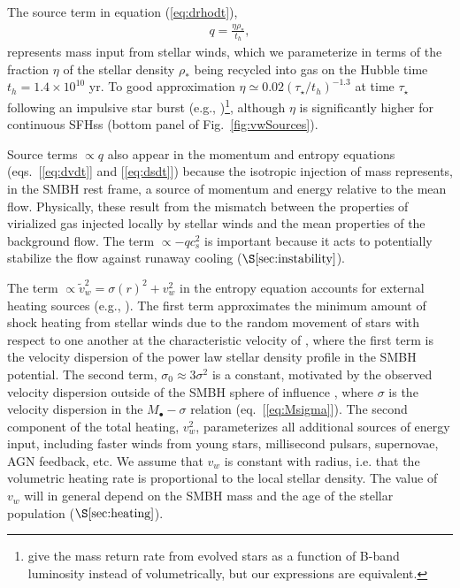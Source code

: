 \documentclass[usenatbib,fleqn]{mn2e}
\newcommand{\vw}{\tilde{v}_{w}}
\newcommand{\rhostar}{\rho_*}
\newcommand{\Mbh}[1][]{M_{\bullet#1}}
\renewcommand{\th}{t_h}
\begin{document}
The source term in equation (\ref{eq:drhodt}),
\begin{align}
  q=\frac{\eta \rhostar}{\th},
\label{eq:q}
\end{align}
represents mass input from stellar winds, which we parameterize in
terms of the fraction $\eta$ of the stellar density $\rhostar$ being
recycled into gas on the Hubble time $\th = 1.4 \times 10^{10}$ yr.
To good approximation $\eta\simeq 0.02 (\tau_{\star}/t_h)^{-1.3}$ at
time $\tau_{\star}$ following an impulsive star burst (e.g.,
\citealt{Ciotti+91})\footnote{\citet{Ciotti+91} give the mass return
  rate from evolved stars as a function of B-band luminosity instead
  of volumetrically, but our expressions are equivalent.}, although
$\eta$ is significantly higher for continuous SFHss
(bottom panel of Fig.~\ref{fig:vwSources}).

Source terms $\propto q$ also appear in the momentum and entropy
equations (eqs.~[\ref{eq:dvdt}] and [\ref{eq:dsdt}]) because the isotropic injection of mass represents, in the SMBH rest frame, a source of momentum
and energy relative to the mean flow.  Physically, these result from
the mismatch between the properties of virialized gas injected locally
by stellar winds and the mean properties of the background flow.  The
term $\propto -q c_{s}^{2}$ is important because it acts to potentially stabilize the flow against runaway cooling ($\S\ref{sec:instability}$).

The term $\propto \vw^2 = \sigma(r)^2+v_{w}^2$ in the entropy equation
accounts for external heating sources (e.g.,
\citealt{ShcherbakovWong+:2014a}).  The first term approximates the
minimum amount of shock heating from stellar winds due to the random
movement of stars with respect to one another at the characteristic
velocity of 
\be\sigma \approx \sqrt{\frac{3 G \Mbh}{(\Gamma+2)
    r}+\sigma_0^2},
\label{eq:sigmarel}
\ee where the first term is the velocity dispersion of the power law
stellar density profile in the SMBH potential.  The second term,
$\sigma_0\approx 3 \sigma^2$ is a constant, motivated by the observed
velocity dispersion outside of the SMBH sphere of influence
\citep{ChaeBernardi+:2014a}, where $\sigma$ is the velocity dispersion
in the $\Mbh-\sigma$ relation (eq.~[\ref{eq:Msigma}]).  The second
component of the total heating, $v_{w}^{2}$, parameterizes all
additional sources of energy input, including faster winds from young
stars, millisecond pulsars, supernovae, AGN feedback, etc.  We assume
that $v_w$ is constant with radius, i.e. that the volumetric heating
rate is proportional to the local stellar density.  The value of $v_w$
will in general depend on the SMBH mass and the age of the stellar
population ($\S\ref{sec:heating}$).
\end{document}
